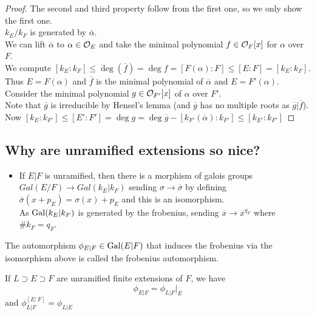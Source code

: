 \documentclass[../main.tex]{subfiles}
\begin{document}
\begin{proof}
The second and third property follow from the first one, so we only show the first one.\\
$k_E /k_F$ is generated by $ \overline{\alpha}$.\\
We can lift $\overline{\alpha}$ to $\alpha\in \mathcal{O}_E$ and take the minimal polynomial $f\in \mathcal{O}_F[x]$ for $\alpha$ over $F$.\\
We compute $ [ k_E:k_F] \leq  \deg ( \overline{f}) = \deg f= [ F( \alpha) : F] \leq [ E:F] = [ k_E:k_F]  $.\\
Thus $E= F( \alpha) $ and $\overline{f}$ is the minimal polynomial of $ \overline{\alpha}$ and $E= F'( \alpha) $.\\
Consider the minimal polynomial $g\in \mathcal{O}_{F'} [ x] $ of $\alpha$ over $F'$.\\
Note that $ \overline{g}$ is irreducible by Hensel's lemma (and $\overline{g}$ has no multiple roots as $\overline{g}| \overline{f}$).\\
Now $ [ k_E:k_{F'} ] \leq  [ E':F'] = \deg g = \deg \overline{g} - [ k_{F'} ( \overline{\alpha}) : k_{F'} ] \leq  [ k_{E'} : k_{F'} ] $ 
\end{proof}
\subsection*{Why are unramified extensions so nice?}
\begin{itemize}
\item If $E|F$ is unramified, then there is a morphism of galois groups $Gal( E /F) \to Gal( k_E | k_F) $ sending $\sigma \to \overline{\sigma}$ by defining $\overline{\sigma}( x+ p_E) = \sigma( x) + p_E$ and this is an isomorphism.\\
	As $\operatorname{Gal}( k_E| k_F) $ is generated by the frobenius, sending $ \overline{x}\to \overline{x}^{q_F}$ where $\# k_F=q_F$.
\end{itemize}
\begin{defn}
	The automorphism $\phi_{E|F} \in \operatorname{Gal} ( E|F) $ that induces the frobenius via the isomorphism above is called the frobenius automorphism.
\end{defn}
\begin{thm}
If $L \supset E \supset F$ are unramified finite extensions of $F$, we have
\[ 
\phi_{E|F} = \phi_{L|F} |_E
\]
and $\phi_{L|F} ^{[E:F]}= \phi_{L |E} $ 
\end{thm}
\end{document}
